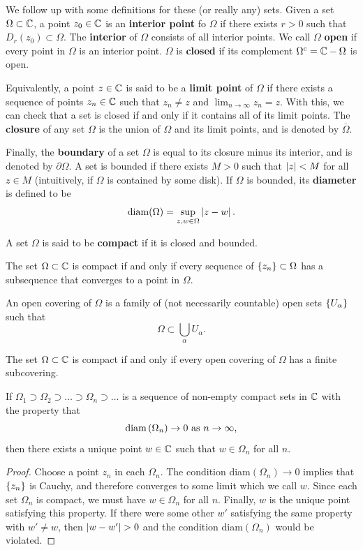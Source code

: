 \documentclass{exam}
\begin{document}
We follow up with some definitions for these (or really any) sets. Given a set $\Omega\subset\mathbb{C}$,
a point $z_0\in\mathbb{C}$ is an \textbf{interior point} fo $\Omega$ if there exists $r > 0$ such that 
$D_r(z_0) \subset\Omega$. The \textbf{interior} of $\Omega$ consists of all interior points. We 
call $\Omega$ \textbf{open} if every point in $\Omega$ is an interior point. $\Omega$ is \textbf{closed} if
its complement $\Omega^c = \mathbb{C} - \Omega$ is open.

Equivalently, a point $z\in\mathbb{C}$ is said to be a \textbf{limit point} of $\Omega$ if there exists
a sequence of points $z_n\in\mathbb{C}$ such that $z_n \neq z$ and $\lim_{n\to\infty} z_n = z$. With this,
we can check that a set is closed if and only if it contains all of its limit points. The \textbf{closure}
of any set $\Omega$ is the union of $\Omega$ and its limit points, and is denoted by $\overline{\Omega}$.

Finally, the \textbf{boundary} of a set $\Omega$ is equal to its closure minus its interior, and is denoted
by $\partial \Omega$. A set is bounded if there exists $M > 0$ such that $\left| z \right| < M$ for all
$z\in M$ (intuitively, if $\Omega$ is contained by some disk). If $\Omega$ is bounded, its \textbf{diameter} 
is defined to be
$$\text{diam}(\Omega) = \sup_{z,w\in \Omega} \left| z - w \right|.$$

A set $\Omega$ is said to be \textbf{compact} if it is closed and bounded.


\begin{theorem}\label{thm:main}
    The set $\Omega\subset\mathbb{C}$ is compact if and only if every sequence of $\left \{ z_n \right \}\subset \Omega$
    has a subsequence that converges to a point in $\Omega$.
\end{theorem}

An open covering of $\Omega$ is a family of (not necessarily countable) open sets $\left \{ U_\alpha \right \}$
such that
$$\Omega \subset \bigcup_\alpha U_\alpha.$$

\begin{theorem}\label{thm:main}
    The set $\Omega\subset\mathbb{C}$ is compact if and only if every open covering of $\Omega$ has a finite
    subcovering.
\end{theorem}

\begin{proposition}\label{prop:main}
    If $\Omega_1 \supset \Omega_2 \supset \hdots \supset \Omega_n \supset \hdots$ is a sequence of 
    non-empty compact sets in $\mathbb{C}$ with the property that
    $$\text{diam}\left( \Omega_n \right) \to 0 \text{ as } n\to\infty,$$
    then there exists a unique point $w\in\mathbb{C}$ such that $w\in\Omega_n$ for all $n$.
\end{proposition}
\begin{proof}
    Choose a point $z_n$ in each $\Omega_n$. The condition diam$(\Omega_n)\to 0$ implies that $\left \{ z_n \right \}$
    is Cauchy, and therefore converges to some limit which we call $w$. Since each set $\Omega_n$ is
    compact, we must have $w\in\Omega_n$ for all $n$. Finally, $w$ is the unique point satisfying
    this property. If there were some other $w'$ satisfying the same property with $w' \neq w$, then 
    $\left| w - w' \right| > 0$ and the condition diam$(\Omega_n)$ would be violated.
\end{proof}
\end{document}
